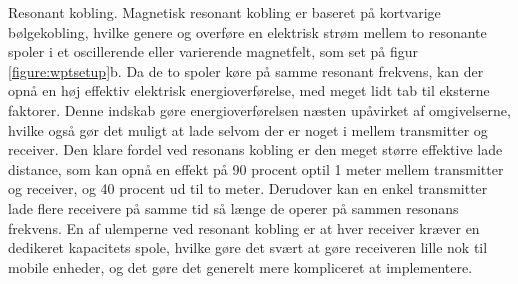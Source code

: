 Resonant kobling. 
Magnetisk resonant kobling er baseret på kortvarige bølgekobling, hvilke genere og overføre en elektrisk strøm mellem to resonante spoler i et oscillerende eller varierende magnetfelt, som set på figur \ref{figure:wptsetup}b. Da de to spoler køre på samme resonant frekvens, kan der opnå en høj effektiv elektrisk energioverførelse, med meget lidt tab til  eksterne faktorer. Denne indskab gøre energioverførelsen næsten upåvirket af omgivelserne, hvilke også gør det muligt at lade selvom der er noget i mellem transmitter og receiver. 
Den klare fordel ved resonans kobling er den meget større effektive lade distance, som kan opnå en effekt på 90 procent optil 1 meter mellem transmitter og receiver, og 40 procent ud til to meter. \cite{mikro} Derudover kan en enkel transmitter lade flere receivere på samme tid så længe de operer på sammen resonans frekvens.
En af ulemperne ved resonant kobling er at hver receiver kræver en dedikeret kapacitets spole, hvilke gøre det svært at gøre receiveren lille nok til mobile enheder, og det gøre det generelt mere kompliceret at implementere. \cite{mikro}